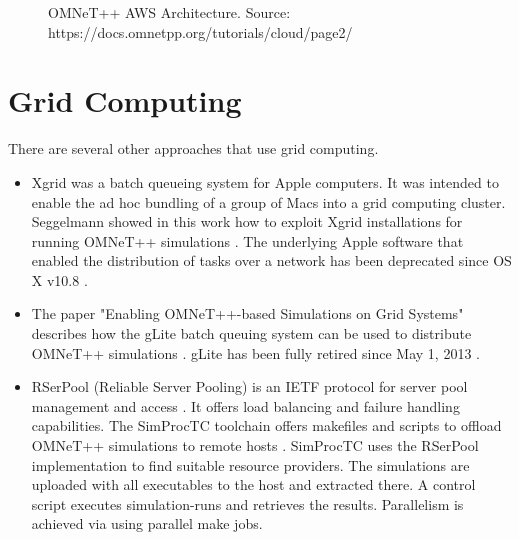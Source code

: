 \begin{figure}[h]
  \centering
  
  \caption{OMNeT++ AWS Architecture. Source: https://docs.omnetpp.org/tutorials/cloud/page2/}
  \label{fig:omnetppaws}
\end{figure}

\section{Grid Computing}

There are several other approaches that use grid computing.
\begin{itemize}
  \item Xgrid was a batch queueing system for Apple computers. It was intended to enable the ad hoc bundling of a group of Macs into a grid computing cluster. Seggelmann showed in this work how to exploit Xgrid installations for running OMNeT++ simulations \cite{seggelmann2009parallelizing}. The underlying Apple software that enabled the distribution of tasks over a network has been deprecated since OS X v10.8 \cite{wiki:xgrid}.
  
  \item The paper "Enabling OMNeT++-based Simulations on Grid Systems" describes how the gLite batch queuing system can be used to distribute OMNeT++ simulations \cite{kozlovszky2009enabling}. gLite has been fully retired since May 1, 2013 \cite{web:glite}.

  \item RSerPool (Reliable Server Pooling) is an IETF protocol for server pool management and access \cite{dreibholz2008reliable}. It offers load balancing and failure handling capabilities. The SimProcTC toolchain offers makefiles and scripts to offload OMNeT++ simulations to remote hosts \cite{dreibholz2008powerful}. SimProcTC uses the RSerPool implementation to find suitable resource providers. The simulations are uploaded with all executables to the host and extracted there. A control script executes simulation-runs and retrieves the results. Parallelism is achieved via using parallel make jobs.

\end{itemize}
